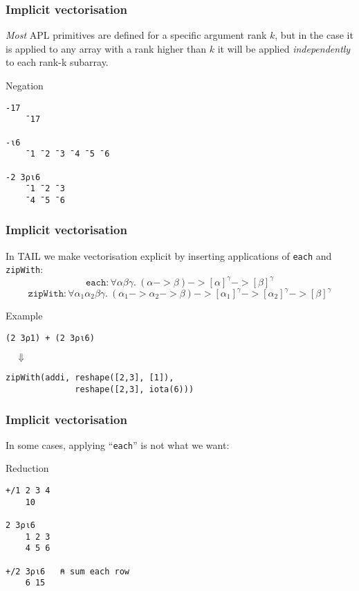 \documentclass{beamer}
\newcommand{\kw}[1]{\texttt{#1}}
\begin{document}
\begin{frame}[fragile]
\frametitle{Implicit vectorisation}

\textit{Most} APL primitives are defined for a specific argument rank
$k$, but in the case it is applied to any array with a rank higher
than $k$ it will be applied \textit{independently} to each rank-k
subarray.

\begin{block}{Negation}
\vspace{-4mm}
\begin{verbatim}-17
    ¯17

-⍳6
    ¯1 ¯2 ¯3 ¯4 ¯5 ¯6

-2 3⍴⍳6
    ¯1 ¯2 ¯3
    ¯4 ¯5 ¯6
\end{verbatim}
\vspace{-4mm}
\end{block}
\end{frame}

\begin{frame}[fragile]
\frametitle{Implicit vectorisation}

In TAIL we make vectorisation explicit by inserting
applications of \texttt{each} and \texttt{zipWith}:\\

$$\texttt{each} : \forall\alpha\beta\gamma.~(\alpha -> \beta) ->
  [\alpha]^\gamma -> [\beta]^{\gamma}$$
$$\texttt{zipWith} :
  \forall\alpha_1\alpha_2\beta\gamma.~(\alpha_1 -> \alpha_2 -> \beta)
  -> [\alpha_1]^\gamma -> [\alpha_2]^\gamma -> [\beta]^{\gamma}$$


\begin{block}{Example}
\vspace{-4mm}
\begin{verbatim}
(2 3⍴1) + (2 3⍴⍳6)
\end{verbatim}

$\quad\Downarrow$

\begin{verbatim}
zipWith(addi, reshape([2,3], [1]),
              reshape([2,3], iota(6)))
\end{verbatim}
\vspace{-4mm}
\end{block}
\end{frame}


\begin{frame}[fragile]
\frametitle{Implicit vectorisation}

In some cases, applying ``\kw{each}'' is not what we want:

\begin{block}{Reduction}
\vspace{-4mm}
\begin{verbatim}
+/1 2 3 4
    10

2 3⍴⍳6
    1 2 3
    4 5 6

+/2 3⍴⍳6   ⍝ sum each row
    6 15
\end{verbatim}
\vspace{-4mm}
\end{block}


\end{frame}
\end{document}
